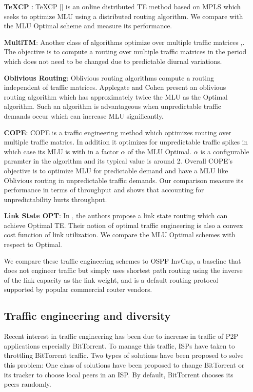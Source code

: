 \textbf{TeXCP} : TeXCP  [\cite{TeXCP}]  is an online distributed TE method based on MPLS which seeks to optimize MLU using a distributed routing algorithm. We compare with the MLU Optimal scheme and measure its performance.


\textbf{MultiTM}: Another class of algorithms optimize over multiple traffic matrices \cite{MultiTM},\cite{COPE}. The objective is to compute a routing over multiple traffic matrices in the period  which does not need to be changed due to predictable diurnal variations.

\textbf{Oblivious Routing}: Oblivious routing algorithms compute a routing independent of traffic matrices. Applegate and Cohen \cite{ObliviousRouting} present an oblivious routing algorithm which has approximately twice the MLU as the Optimal algorithm. Such an algorithm is advantageous when unpredictable traffic demands occur which can increase MLU significantly.

\textbf{COPE}: COPE is a traffic engineering method which optimizes routing over multiple traffic matrics. In addition it optimizes for unpredictable traffic spikes in which case its MLU is with in a factor $\alpha$ of the MLU Optimal. $\alpha$ is a configurable paramter in the algorithm and its typical value is around 2. Overall COPE's objective is to optimize MLU for predictable demand and have a MLU like Oblivious routing in unpredictable traffic demands. Our comparison measure its performance in terms of throughput and shows that accounting for unpredictability hurts throughput.

\textbf{Link State OPT}: In \cite{LinkStateOPT}, the authors propose a link state routing which can achieve Optimal TE. Their notion of optimal traffic engineering is also a convex cost function of link utilization. We compare the MLU Optimal schemes with respect to Optimal.

We compare these traffic engineering schemes to OSPF InvCap, a baseline that does not engineer traffic but simply uses shortest path routing using the inverse of the link capacity as the link weight, and is a default routing protocol supported by popular commercial router vendors.


\subsection{Traffic engineering and diversity}
Recent interest in traffic engineering has been due to increase in traffic of P2P applications especially BitTorrent. To manage this traffic, ISPs have taken to throttling BitTorrent traffic. Two types of solutions have been proposed to solve this problem: One class of solutions have been proposed to change BitTorrent or its tracker to choose local peers in an ISP. By default, BitTorrent chooses its peers randomly. 

